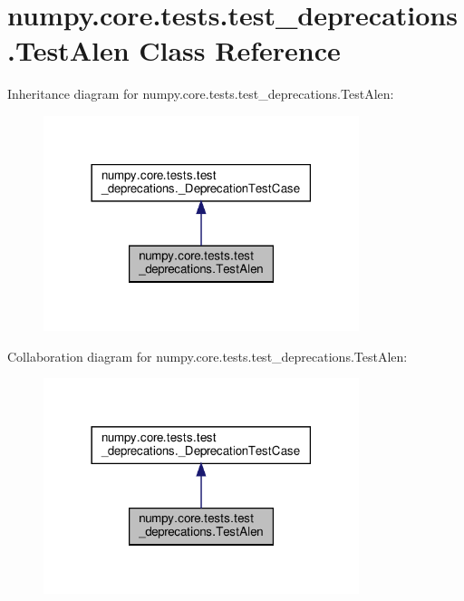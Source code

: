\hypertarget{classnumpy_1_1core_1_1tests_1_1test__deprecations_1_1TestAlen}{}\section{numpy.\+core.\+tests.\+test\+\_\+deprecations.\+Test\+Alen Class Reference}
\label{classnumpy_1_1core_1_1tests_1_1test__deprecations_1_1TestAlen}


Inheritance diagram for numpy.\+core.\+tests.\+test\+\_\+deprecations.\+Test\+Alen\+:
\nopagebreak
\begin{figure}[H]
\begin{center}
\leavevmode
\includegraphics[width=261pt]{classnumpy_1_1core_1_1tests_1_1test__deprecations_1_1TestAlen__inherit__graph}
\end{center}
\end{figure}


Collaboration diagram for numpy.\+core.\+tests.\+test\+\_\+deprecations.\+Test\+Alen\+:
\nopagebreak
\begin{figure}[H]
\begin{center}
\leavevmode
\includegraphics[width=261pt]{classnumpy_1_1core_1_1tests_1_1test__deprecations_1_1TestAlen__coll__graph}
\end{center}
\end{figure}
